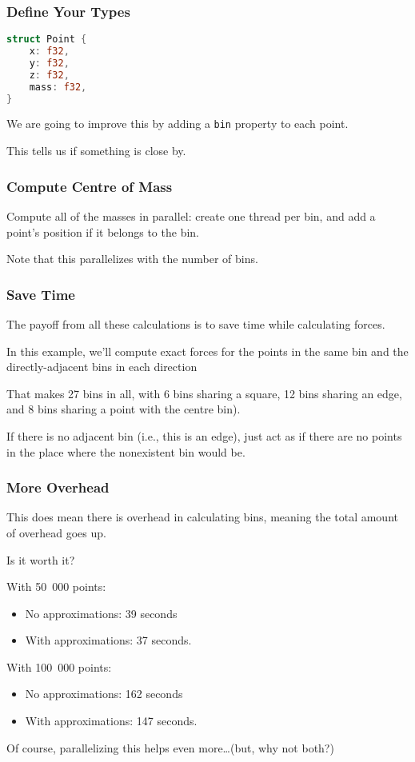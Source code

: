\begin{frame}[fragile]
\frametitle{Define Your Types}

\begin{lstlisting}[language=Rust]
struct Point {
    x: f32,
    y: f32,
    z: f32,
    mass: f32,
}
\end{lstlisting}


We are going to improve this by adding a \texttt{bin} property to each point.

This tells us if something is close by.

\end{frame}



\begin{frame}[fragile]
\frametitle{Compute Centre of Mass}

Compute all of the masses in parallel: create one thread per bin, and add a point's
position if it belongs to the bin.


Note that this parallelizes with the number of bins.


\end{frame}

\begin{frame}
\frametitle{Save Time}

The payoff from all these calculations is to save time while calculating forces. 

In this example, we'll compute exact forces for the points in the same bin and the directly-adjacent bins in each direction

That makes 27 bins in all, with 6 bins sharing a square, 12 bins sharing an edge, and 8 bins sharing a point with the centre bin). 

If there is no adjacent bin 
(i.e., this is an edge), just act as if there are no points 
in the place where the nonexistent bin would be. 

\end{frame}


\begin{frame}
\frametitle{More Overhead}

This does mean there is overhead in calculating bins, meaning the total amount of overhead goes up. 

Is it worth it? 

With 50~000 points:
\begin{itemize}
\item    No approximations: 39 seconds
\item    With approximations: 37 seconds.
\end{itemize}

With 100~000 points:
\begin{itemize}
\item    No approximations: 162 seconds
\item    With approximations: 147 seconds.
\end{itemize}

Of course, parallelizing this helps even more\ldots (but, why not both?)

\end{frame}




